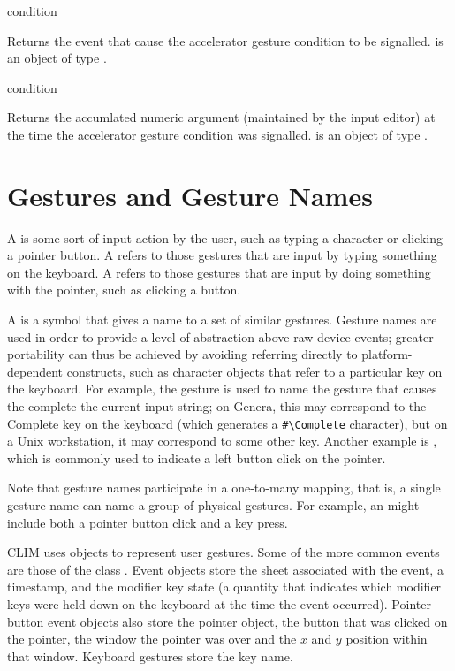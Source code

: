  {condition}

Returns the event that cause the accelerator gesture condition to be signalled.
 is an object of type .

 {condition}

Returns the accumlated numeric argument (maintained by the input editor) at the
time the accelerator gesture condition was signalled.   is an
object of type .


\section {Gestures and Gesture Names\label{gesture-names}}

A  is some sort of input action by the user, such as typing a
character or clicking a pointer button.  A  refers to
those gestures that are input by typing something on the keyboard.  A
 refers to those gestures that are input by doing
something with the pointer, such as clicking a button.

A  is a symbol that gives a name to a set of similar
gestures.  Gesture names are used in order to provide a level of abstraction
above raw device events; greater portability can thus be achieved by avoiding
referring directly to platform-dependent constructs, such as character objects
that refer to a particular key on the keyboard.  For example, the 
gesture is used to name the gesture that causes the  complete
the current input string; on Genera, this may correspond to the Complete key on
the keyboard (which generates a \verb+#\Complete+ character), but on a Unix
workstation, it may correspond to some other key.  Another example is
, which is commonly used to indicate a left button click on the
pointer.

Note that gesture names participate in a one-to-many mapping, that is, a single
gesture name can name a group of physical gestures.  For example, an 
might include both a pointer button click and a key press.

CLIM uses  objects to represent user gestures.  Some of the more
common events are those of the class .  Event objects
store the sheet associated with the event, a timestamp, and the modifier key
state (a quantity that indicates which modifier keys were held down on the
keyboard at the time the event occurred).  Pointer button event objects also
store the pointer object, the button that was clicked on the pointer, the window
the pointer was over and the $x$ and $y$ position within that window.  Keyboard
gestures store the key name.

